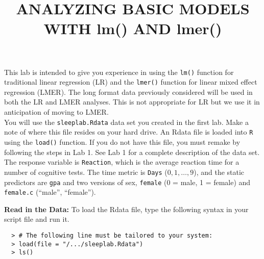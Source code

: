 \documentclass[]{article}
\title{ANALYZING BASIC MODELS WITH lm() AND lmer()}
\author{}
\date{}
\begin{document}
\maketitle 
\thispagestyle{fancy}

\noindent This lab is intended to give you experience in using the \texttt{lm()} function for traditional
linear regression (LR) and the \texttt{lmer()} function for linear mixed effect regression (LMER). The long format data previously considered will be used in both the LR and LMER analyses. This is not appropriate for LR but we use it in anticipation of moving to LMER.\\
\linebreak
You will use the \texttt{sleeplab.Rdata} data set you created in the first lab. Make a note of where this file resides on your hard drive. An Rdata file is loaded into \texttt{R} using the \texttt{load()} function. If you do not have this file, you must remake by following the steps in Lab 1. See Lab 1 for a complete description of the data set. The response variable is \texttt{Reaction}, which is the average reaction time for a number of cognitive tests. The time metric is \texttt{Days} ($0,1,\ldots,9$), and the static predictors are \texttt{gpa} and two versions of sex, \texttt{female} (0 = male, 1 = female) and \texttt{female.c} (``male'', ``female'').\\
\linebreak
\pagebreak

\noindent\textbf{Read in the Data:} To load the Rdata file, type the following syntax in your script file and run it.

\begin{verbatim}
  > # The following line must be tailored to your system:
  > load(file = "/.../sleeplab.Rdata")
  > ls()
\end{verbatim}
\end{document}
